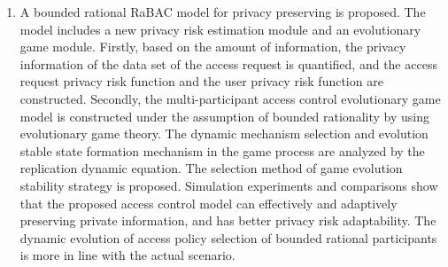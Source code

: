 \begin{englishabstract}
\begin{enumerate}
		\item 
		A bounded rational RaBAC model for privacy preserving is proposed. The model includes a new privacy risk estimation module and an evolutionary game module. Firstly, based on the amount of information, the privacy information of the data set of the access request is quantified, and the access request privacy risk function and the user privacy risk function are constructed. Secondly, the multi-participant access control evolutionary game model is constructed under the assumption of bounded rationality by using evolutionary game theory. The dynamic mechanism selection and evolution stable state formation mechanism in the game process are analyzed by the replication dynamic equation. The selection method of game evolution stability strategy is proposed. Simulation experiments and comparisons show that the proposed access control model can effectively and adaptively preserving private information, and has better privacy risk adaptability. The dynamic evolution of access policy selection of bounded rational participants is more in line with the actual scenario.
	\end{enumerate}
\end{englishabstract}